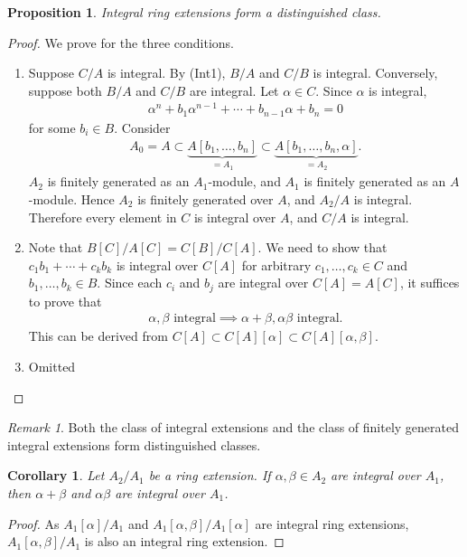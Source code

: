 \documentclass[12pt]{report}
\theoremstyle{plain}
\newtheorem{corollary}[theorem]{Corollary}
\newtheorem{proposition}[theorem]{Proposition}
\theoremstyle{remark}
\newtheorem*{remark}{Remark}
\theoremstyle{definition}
\begin{document}
\begin{proposition}
    Integral ring extensions form a distinguished class.
\end{proposition}
\begin{proof}
    We prove for the three conditions.
    \begin{enumerate}
        \item Suppose $C/A$ is integral. By (Int1), $B/A$ and $C/B$ is integral. Conversely, suppose both $B/A$ and $C/B$ are integral. Let $\alpha\in C$. Since $\alpha$ is integral,
        \begin{align*}
            \alpha^n + b_1\alpha^{n-1}+\cdots+b_{n-1}\alpha+b_n=0
        \end{align*}
        for some $b_i\in B$. Consider
        \begin{align*}
            A_0=A \subset \underbrace{A[b_1,\dots,b_n]}_{=A_1} \subset \underbrace{A[b_1,\dots,b_n,\alpha]}_{=A_2}.
        \end{align*}
        $A_2$ is finitely generated as an $A_1$-module, and $A_1$ is finitely generated as an $A$-module. Hence $A_2$ is finitely generated over $A$, and $A_2/A$ is integral. Therefore every element in $C$ is integral over $A$, and $C/A$ is integral.
        \item Note that $B[C]/A[C]=C[B]/C[A]$. We need to show that $c_1b_1+\cdots+c_kb_k$ is integral over $C[A]$ for arbitrary $c_1,\dots,c_k\in C$ and $b_1,\dots,b_k\in B$. Since each $c_i$ and $b_j$ are integral over $C[A]=A[C]$, it suffices to prove that
        \begin{align*}
            \alpha,\beta\text{~integral}\implies \alpha+\beta,\alpha\beta\text{~integral}.
        \end{align*}
        This can be derived from $C[A]\subset C[A][\alpha]\subset C[A][\alpha,\beta]$.
        \item Omitted
    \end{enumerate}
\end{proof}
\begin{remark}
    Both the class of integral extensions and the class of finitely generated integral extensions form distinguished classes.
\end{remark}

\begin{corollary}
    Let $A_2/A_1$ be a ring extension. If $\alpha,\beta\in A_2$ are integral over $A_1$, then $\alpha+\beta$ and $\alpha\beta$ are integral over $A_1$.
\end{corollary}
\begin{proof}
    As $A_1[\alpha]/A_1$ and $A_1[\alpha,\beta]/A_1[\alpha]$ are integral ring extensions, $A_1[\alpha,\beta]/A_1$ is also an integral ring extension.
\end{proof}
\end{document}
